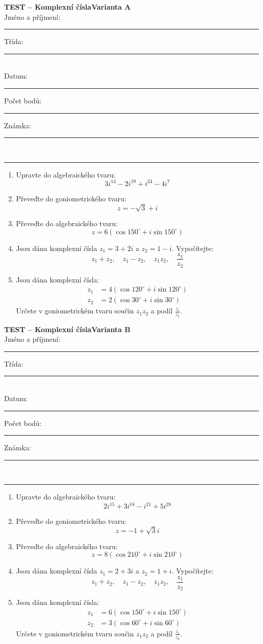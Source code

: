 \documentclass[a4paper,10pt,landscape]{article}
\newcommand{\TestTitle}{Komplexní čísla}
\newcommand{\TestHeader}[1]{%
    {\bfseries TEST -- \TestTitle}\hfill{\bfseries Varianta #1}\\[2mm]
    Jméno a příjmení: \rule{4.5cm}{0.4pt}\hfill Třída: \rule{1.5cm}{0.4pt}\\[2mm]
    Datum: \rule{2.4cm}{0.4pt}\hfill Počet bodů: \rule{1.4cm}{0.4pt}\hfill Známka: \rule{1.4cm}{0.4pt}\\[1mm]
    \hrule\vspace{3mm}
}
\newcommand{\AnswerSpace}[1]{\vspace{#1}}
\begin{document}
\noindent
\begin{minipage}[t]{0.48\textwidth}
    \small
    \TestHeader{A}

    \begin{enumerate}
        \item Upravte do algebraického tvaru: \[3i^{14}-2i^{19}+i^{24}-4i^7\]
        \AnswerSpace{10mm}
        \item Převeďte do goniometrického tvaru: \[z=-\sqrt3+i\]
        \AnswerSpace{12mm}
        \item Převeďte do algebraického tvaru: \[z=6(\cos150^\circ+i\sin150^\circ)\]
        \AnswerSpace{10mm}
        \item Jsou dána komplexní čísla \(z_1=3+2i\) a \(z_2=1-i\). Vypočítejte: \[z_1+z_2,\quad z_1-z_2,\quad z_1z_2,\quad \frac{z_1}{z_2}\]
        \AnswerSpace{25mm}
        \item Jsou dána komplexní čísla: \[\begin{aligned}z_1&=4(\cos120^\circ+i\sin120^\circ)\\z_2&=2(\cos30^\circ+i\sin30^\circ)\end{aligned}\] Určete v goniometrickém tvaru součin \(z_1z_2\) a podíl \(\frac{z_1}{z_2}\).
        \AnswerSpace{20mm}
    \end{enumerate}
\end{minipage}%
\hfill\vrule width 0.4pt\hfill
\begin{minipage}[t]{0.48\textwidth}
    \small
    \TestHeader{B}

    \begin{enumerate}
        \item Upravte do algebraického tvaru: \[2i^{15}+3i^{18}-i^{21}+5i^{28}\]
        \AnswerSpace{10mm}
        \item Převeďte do goniometrického tvaru: \[z=-1+\sqrt3i\]
        \AnswerSpace{12mm}
        \item Převeďte do algebraického tvaru: \[z=8(\cos210^\circ+i\sin210^\circ)\]
        \AnswerSpace{10mm}
        \item Jsou dána komplexní čísla \(z_1=2+3i\) a \(z_2=1+i\). Vypočítejte: \[z_1+z_2,\quad z_1-z_2,\quad z_1z_2,\quad \frac{z_1}{z_2}\]
        \AnswerSpace{25mm}
        \item Jsou dána komplexní čísla: \[\begin{aligned}z_1&=6(\cos150^\circ+i\sin150^\circ)\\z_2&=3(\cos60^\circ+i\sin60^\circ)\end{aligned}\] Určete v goniometrickém tvaru součin \(z_1z_2\) a podíl \(\frac{z_1}{z_2}\).
        \AnswerSpace{20mm}
    \end{enumerate}
\end{minipage}
\end{document}
